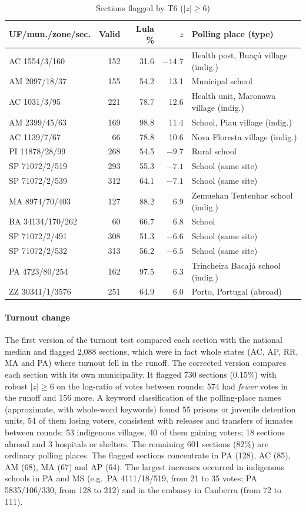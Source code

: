 \documentclass[fleqn,10pt]{SelfArx}
\begin{document}
\begin{table}[ht]
\caption{Sections flagged by T6 ($|z|\geq6$)}
\label{tab:t6}
\centering\scriptsize
\begin{tabular}{@{}l r r r L{3.1cm}@{}}
\toprule
\textbf{UF/mun./zone/sec.} & \textbf{Valid} & \textbf{Lula \%} & \textbf{$z$} & \textbf{Polling place (type)} \\
\midrule
AC 1554/3/160 & 152 & 31.6 & $-14.7$ & Health post, Bua\c{c}\'u village (indig.) \\
AM 2097/18/37 & 155 & 54.2 & 13.1 & Municipal school \\
AC 1031/3/95 & 221 & 78.7 & 12.6 & Health unit, Maronawa village (indig.) \\
AM 2399/45/63 & 169 & 98.8 & 11.4 & School, Piau village (indig.) \\
AC 1139/7/67 & 66 & 78.8 & 10.6 & Nova Floresta village (indig.) \\
PI 11878/28/99 & 268 & 54.5 & $-9.7$ & Rural school \\
SP 71072/2/519 & 293 & 55.3 & $-7.1$ & School (same site) \\
SP 71072/2/539 & 312 & 64.1 & $-7.1$ & School (same site) \\
MA 8974/70/403 & 127 & 88.2 & 6.9 & Zemuehan Tentenhar school (indig.) \\
BA 34134/170/262 & 60 & 66.7 & 6.8 & School \\
SP 71072/2/491 & 308 & 51.3 & $-6.6$ & School (same site) \\
SP 71072/2/532 & 313 & 56.2 & $-6.5$ & School (same site) \\
PA 4723/80/254 & 162 & 97.5 & 6.3 & Trincheira Bacaj\'a school (indig.) \\
ZZ 30341/1/3576 & 251 & 64.9 & 6.0 & Porto, Portugal (abroad) \\
\bottomrule
\end{tabular}
\end{table}

\paragraph{Turnout change} The first version of the turnout test compared
each section with the national median and flagged 2,088 sections, which
were in fact whole states (AC, AP, RR, MA and PA) where turnout fell in the
runoff. The corrected version compares each section with its own
municipality. It flagged 730 sections (0.15\%) with robust $|z|\geq6$ on
the log-ratio of votes between rounds: 574 had \emph{fewer} votes in the
runoff and 156 more. A keyword classification of the polling-place names
(approximate, with whole-word keywords) found 55 prisons or juvenile
detention units, 54 of them losing voters, consistent with releases and transfers of inmates between
rounds; 53 indigenous villages, 40 of them gaining voters; 18 sections
abroad and 3 hospitals or shelters. The remaining 601 sections (82\%) are
ordinary polling places. The flagged sections concentrate in PA
(128), AC (85), AM (68), MA (67) and AP (64). The largest increases occurred
in indigenous schools in PA and MS (e.g.\ PA 4111/18/519, from 21 to 35
votes; PA 5835/106/330, from 128 to 212) and in the embassy in Canberra
(from 72 to 111).
\end{document}
